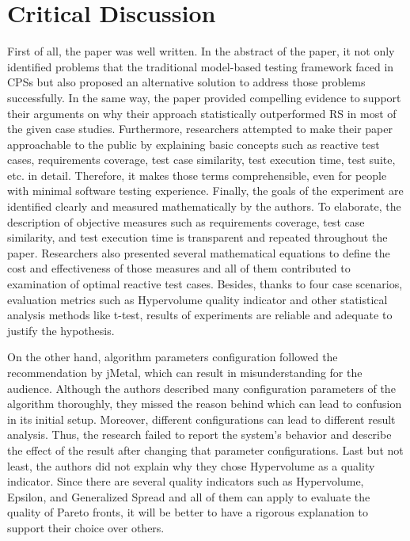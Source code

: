 \documentclass[10pt,a4paper]{report}
\begin{document}
\section{Critical Discussion}

First of all, the paper was well written. In the abstract of the paper, it not only identiﬁed problems that the traditional model-based testing framework faced in CPSs but also proposed an alternative solution to address those problems successfully. In the same way, the paper provided compelling evidence to support their arguments on why their approach statistically outperformed RS in most of the given case studies. Furthermore, researchers attempted to make their paper approachable to the public by explaining basic concepts such as reactive test cases, requirements coverage, test case similarity, test execution time, test suite, etc. in detail. Therefore, it makes those terms comprehensible, even for people with minimal software testing experience. Finally, the goals of the experiment are identiﬁed clearly and measured mathematically by the authors. To elaborate, the description of objective measures such as requirements coverage, test case similarity, and test execution time is transparent and repeated throughout the paper. Researchers also presented several mathematical equations to deﬁne the cost and eﬀectiveness of those measures and all of them contributed to examination of optimal reactive test cases. Besides, thanks to four case scenarios, evaluation metrics such as Hypervolume quality indicator and other statistical analysis methods like t-test, results of experiments are reliable and adequate to justify the hypothesis.

On the other hand, algorithm parameters conﬁguration followed the recommendation by jMetal, which can result in misunderstanding for the audience. Although the authors described many conﬁguration parameters of the algorithm thoroughly, they missed the reason behind which can lead to confusion in its initial setup. Moreover, diﬀerent configurations can lead to diﬀerent result analysis. Thus, the research failed to report the system’s behavior and describe the eﬀect of the result after changing that parameter conﬁgurations. Last but not least, the authors did not explain why they chose Hypervolume as a quality indicator. Since there are several quality indicators such as Hypervolume, Epsilon, and Generalized Spread and all of them can apply to evaluate the quality of Pareto fronts, it will be better to have a rigorous explanation to support their choice over others.
\end{document}
